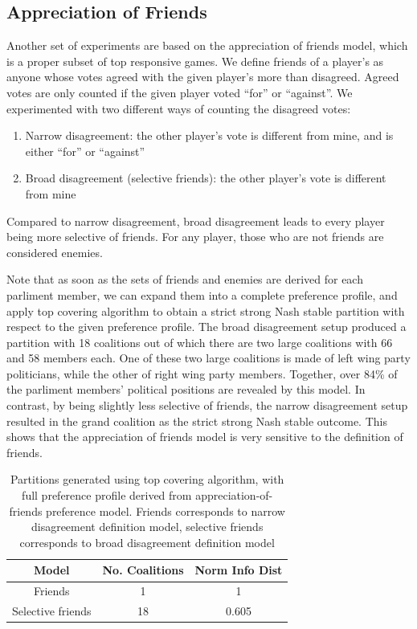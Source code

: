 \documentclass[letterpaper]{article} %
\begin{document}
\subsection{Appreciation of Friends}
Another set of experiments are based on the appreciation of friends model, which is a proper subset of top responsive games. We define friends of a player's as anyone whose votes agreed with the given player's more than disagreed. Agreed votes are only counted if the given player voted ``for'' or ``against''. We experimented with two different ways of counting the disagreed votes:

\begin{enumerate}
  \item Narrow disagreement: the other player's vote is different from mine, and is either ``for'' or ``against''
  \item Broad disagreement (selective friends): the other player's vote is different from mine
\end{enumerate}

Compared to narrow disagreement, broad disagreement leads to every player being more selective of friends. For any player, those who are not friends are considered enemies.

Note that as soon as the sets of friends and enemies are derived for each parliment member, we can expand them into a complete preference profile, and apply top covering algorithm to obtain a strict strong Nash stable partition with respect to the given preference profile. The broad disagreement setup produced a partition with 18 coalitions out of which there are two large coalitions with 66 and 58 members each. One of these two large coalitions is made of left wing party politicians, while the other of right wing party members. Together, over 84\% of the parliment members' political positions are revealed by this model. In contrast, by being slightly less selective of friends, the narrow disagreement setup resulted in the grand coalition as the strict strong Nash stable outcome. This shows that the appreciation of friends model is very sensitive to the definition of friends.

\begin{table}[h!]
\centering
\begin{tabular}{c|c|c}
\hline
Model & No. Coalitions & Norm Info Dist \\
\hline
Friends & 1 & 1 \\
Selective friends & 18 & 0.605 \\
\hline
\end{tabular}
\caption{Partitions generated using top covering algorithm, with full preference profile derived from appreciation-of-friends preference model. Friends corresponds to narrow disagreement definition model, selective friends corresponds to broad disagreement definition model}
\label{table:friends_models}
\end{table}
\end{document}
